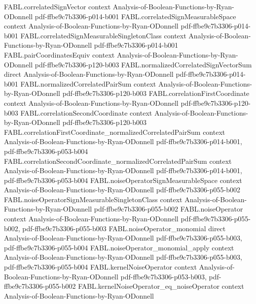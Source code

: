 \begin{theorem}
\proofstep
  {FABL.correlatedSignVector}
  {context}
  {Analysis-of-Boolean-Functions-by-Ryan-ODonnell}
  {pdf-ffbe9c7b3306-p014-b001}
\proofstep
  {FABL.correlatedSignMeasurableSpace}
  {context}
  {Analysis-of-Boolean-Functions-by-Ryan-ODonnell}
  {pdf-ffbe9c7b3306-p014-b001}
\proofstep
  {FABL.correlatedSignMeasurableSingletonClass}
  {context}
  {Analysis-of-Boolean-Functions-by-Ryan-ODonnell}
  {pdf-ffbe9c7b3306-p014-b001}
\proofstep
  {FABL.pairCoordinatesEquiv}
  {context}
  {Analysis-of-Boolean-Functions-by-Ryan-ODonnell}
  {pdf-ffbe9c7b3306-p120-b003}
\proofstep
  {FABL.normalizedCorrelatedSignVectorSum}
  {direct}
  {Analysis-of-Boolean-Functions-by-Ryan-ODonnell}
  {pdf-ffbe9c7b3306-p014-b001}
\proofstep
  {FABL.normalizedCorrelatedPairSum}
  {context}
  {Analysis-of-Boolean-Functions-by-Ryan-ODonnell}
  {pdf-ffbe9c7b3306-p120-b003}
\proofstep
  {FABL.correlationFirstCoordinate}
  {context}
  {Analysis-of-Boolean-Functions-by-Ryan-ODonnell}
  {pdf-ffbe9c7b3306-p120-b003}
\proofstep
  {FABL.correlationSecondCoordinate}
  {context}
  {Analysis-of-Boolean-Functions-by-Ryan-ODonnell}
  {pdf-ffbe9c7b3306-p120-b003}
\proofstep
  {FABL.correlationFirstCoordinate_normalizedCorrelatedPairSum}
  {context}
  {Analysis-of-Boolean-Functions-by-Ryan-ODonnell}
  {pdf-ffbe9c7b3306-p014-b001,
    pdf-ffbe9c7b3306-p053-b004}
\proofstep
  {FABL.correlationSecondCoordinate_normalizedCorrelatedPairSum}
  {context}
  {Analysis-of-Boolean-Functions-by-Ryan-ODonnell}
  {pdf-ffbe9c7b3306-p014-b001,
    pdf-ffbe9c7b3306-p053-b004}
\proofstep
  {FABL.noiseOperatorSignMeasurableSpace}
  {context}
  {Analysis-of-Boolean-Functions-by-Ryan-ODonnell}
  {pdf-ffbe9c7b3306-p055-b002}
\proofstep
  {FABL.noiseOperatorSignMeasurableSingletonClass}
  {context}
  {Analysis-of-Boolean-Functions-by-Ryan-ODonnell}
  {pdf-ffbe9c7b3306-p055-b002}
\proofstep
  {FABL.noiseOperator}
  {context}
  {Analysis-of-Boolean-Functions-by-Ryan-ODonnell}
  {pdf-ffbe9c7b3306-p055-b002,
    pdf-ffbe9c7b3306-p055-b003}
\proofstep
  {FABL.noiseOperator_monomial}
  {direct}
  {Analysis-of-Boolean-Functions-by-Ryan-ODonnell}
  {pdf-ffbe9c7b3306-p055-b003,
    pdf-ffbe9c7b3306-p055-b004}
\proofstep
  {FABL.noiseOperator_monomial_apply}
  {context}
  {Analysis-of-Boolean-Functions-by-Ryan-ODonnell}
  {pdf-ffbe9c7b3306-p055-b003,
    pdf-ffbe9c7b3306-p055-b004}
\proofstep
  {FABL.kernelNoiseOperator}
  {context}
  {Analysis-of-Boolean-Functions-by-Ryan-ODonnell}
  {pdf-ffbe9c7b3306-p053-b003,
    pdf-ffbe9c7b3306-p055-b002}
\proofstep
  {FABL.kernelNoiseOperator_eq_noiseOperator}
  {context}
  {Analysis-of-Boolean-Functions-by-Ryan-ODonnell}

\end{theorem}
